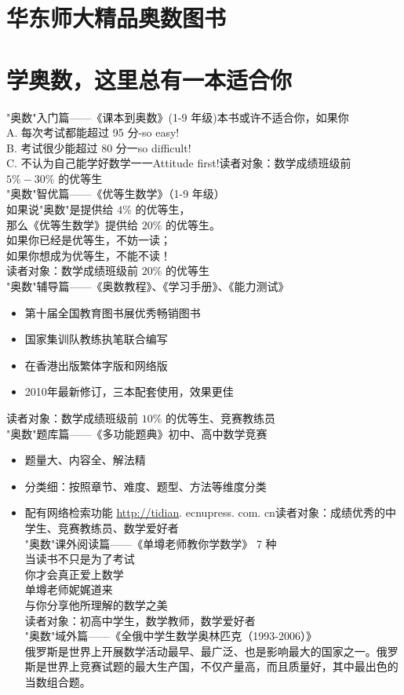 \documentclass[10pt]{article}
\begin{document}
\section*{华东师大精品奥数图书}
\section*{学奥数，这里总有一本适合你}
"奥数"入门篇——《课本到奥数》(1-9 年级)本书或许不适合你，如果你\\
A. 每次考试都能超过 95 分-so easy!\\
B. 考试很少能超过 80 分一so difficult!\\
C. 不认为自己能学好数学一一Attitude first!读者对象：数学成绩班级前 $5 \%-30 \%$ 的优等生\\
"奥数"智优篇——《优等生数学》（1-9 年级）\\
如果说"奥数"是提供给 $4 \%$ 的优等生，\\
那么《优等生数学》提供给 $20 \%$ 的优等生。\\
如果你已经是优等生，不妨一读；\\
如果你想成为优等生，不能不读！\\
读者对象：数学成绩班级前 $20 \%$ 的优等生\\
"奥数"辅导篇——《奥数教程》、《学习手册》、《能力测试》

\begin{itemize}
  \item 第十届全国教育图书展优秀畅销图书
  \item 国家集训队教练执笔联合编写
  \item 在香港出版繁体字版和网络版
  \item 2010年最新修订，三本配套使用，效果更佳
\end{itemize}

读者对象：数学成绩班级前 $10 \%$ 的优等生、竞赛教练员\\
"奥数"题库篇——《多功能题典》初中、高中数学竞赛

\begin{itemize}
  \item 题量大、内容全、解法精
  \item 分类细：按照章节、难度、题型、方法等维度分类
  \item 配有网络检索功能 \href{http://tidian}{http://tidian}. ecnupress. com. cn读者对象：成绩优秀的中学生、竞赛教练员、数学爱好者\\
"奥数"课外阅读篇——《单墫老师教你学数学》 7 种\\
当读书不只是为了考试\\
你才会真正爱上数学\\
单墫老师妮娓道来\\
与你分享他所理解的数学之美\\
读者对象：初高中学生，数学教师，数学爱好者\\
"奥数"域外篇——《全俄中学生数学奥林匹克（1993-2006）》\\
俄罗斯是世界上开展数学活动最早、最广泛、也是影响最大的国家之一。俄罗斯是世界上竞赛试题的最大生产国，不仅产量高，而且质量好，其中最出色的当数组合题。
\end{itemize}
\end{document}
